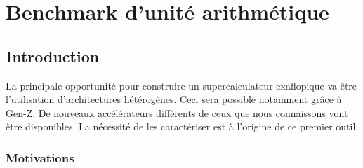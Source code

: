 \newpage
\section{Benchmark d'unité arithmétique}\label{sec:kg}



\subsection{Introduction}
   
     
    La principale opportunité pour construire un supercalculateur exaflopique va être l'utilisation d'architectures hétérogènes. Ceci sera possible notamment grâce à Gen-Z. De nouveaux accélérateurs différents de ceux que nous connaissons vont être disponibles. La nécessité de les caractériser est à l'origine de ce premier outil.

    \subsubsection{Motivations}
    

